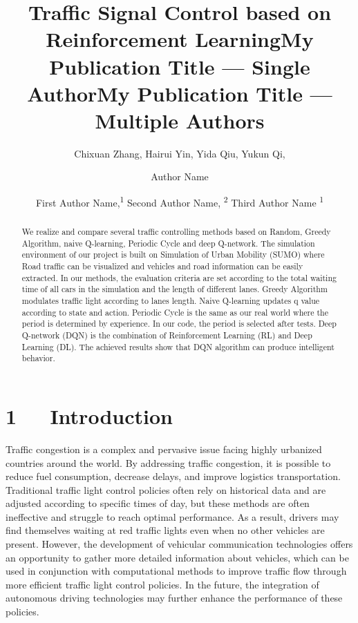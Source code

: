 \documentclass[letterpaper]{article} %
\title{Traffic Signal Control based on Reinforcement Learning}
\author{
    Chixuan Zhang,
    Hairui Yin,
    Yida Qiu,
    Yukun Qi,
}
\title{My Publication Title --- Single Author}
\author {
    Author Name
}
\title{My Publication Title --- Multiple Authors}
\author {
    First Author Name,\textsuperscript{\rm 1}
    Second Author Name, \textsuperscript{\rm 2}
    Third Author Name \textsuperscript{\rm 1}
}
\begin{document}
\maketitle

\begin{abstract}
We realize and compare several traffic controlling methods based on Random, Greedy Algorithm, naive Q-learning, Periodic Cycle and deep Q-network. The simulation environment of our project is built on Simulation of Urban Mobility (SUMO) where Road traffic can be visualized and vehicles and road information can be easily extracted. In our methods, the evaluation criteria are set according to the total waiting time of all cars in the simulation and the length of different lanes. Greedy Algorithm modulates traffic light according to lanes length. Naive Q-learning updates q value according to state and action. Periodic Cycle is the same as our real world where the period is determined by experience. In our code, the period is selected after tests. Deep Q-network (DQN) is the combination of Reinforcement Learning (RL) and Deep Learning (DL).
The achieved results show that DQN algorithm can produce intelligent behavior.
\end{abstract}

\section{1\ \ \ Introduction}

\hspace*{1em}Traffic congestion is a complex and pervasive issue facing highly urbanized countries around the world. By addressing traffic congestion, it is possible to reduce fuel consumption, decrease delays, and improve logistics transportation. Traditional traffic light control policies often rely on historical data and are adjusted according to specific times of day, but these methods are often ineffective and struggle to reach optimal performance. As a result, drivers may find themselves waiting at red traffic lights even when no other vehicles are present. However, the development of vehicular communication technologies offers an opportunity to gather more detailed information about vehicles, which can be used in conjunction with computational methods to improve traffic flow through more efficient traffic light control policies. In the future, the integration of autonomous driving technologies may further enhance the performance of these policies.
\end{document}
